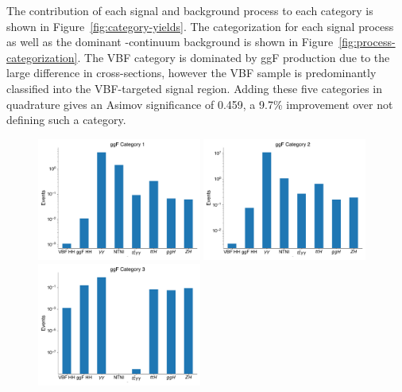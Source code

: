The contribution of each signal and background process to each category is shown in Figure~\ref{fig:category-yields}. The categorization for each signal process as well as the dominant \yy-continuum background is shown in Figure~\ref{fig:process-categorization}. The \gls{VBF} \hh category is dominated by \gls{ggF} production due to the large difference in cross-sections, however the \gls{VBF} \hh sample is predominantly classified into the \gls{VBF}-targeted signal region. Adding these five categories in quadrature gives an Asimov significance of 0.459, a 9.7\% improvement over not defining such a category.

\begin{figure}[p!]
  \centering
  \includegraphics[width=0.48\textwidth]{chapters/chapter6_vbf/images/category_breakdown/ggfcat1.pdf}
  \includegraphics[width=0.48\textwidth]{chapters/chapter6_vbf/images/category_breakdown/ggfcat2.pdf}
  \includegraphics[width=0.48\textwidth]{chapters/chapter6_vbf/images/category_breakdown/ggfcat3.pdf}

\end{figure}
